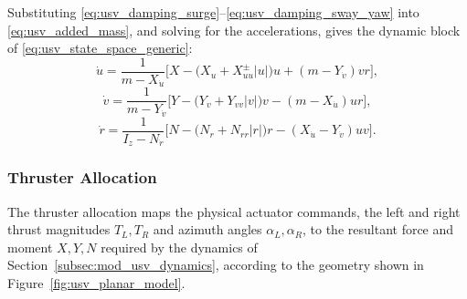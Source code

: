 Substituting \eqref{eq:usv_damping_surge}--\eqref{eq:usv_damping_sway_yaw} into \eqref{eq:usv_added_mass}, and solving for the accelerations, gives the dynamic block of \eqref{eq:usv_state_space_generic}:
\begin{equation}
    \dot{u} = \frac{1}{m - X_{\dot u}}\Big[X - \big(X_u + X_{uu}^{\pm}|u|\big)u + (m - Y_{\dot v})vr\Big],
    \label{eq:usv_udot}
\end{equation}
\begin{equation}
    \dot{v} = \frac{1}{m - Y_{\dot v}}\Big[Y - \big(Y_v + Y_{vv}|v|\big)v - (m - X_{\dot u})ur\Big],
    \label{eq:usv_vdot}
\end{equation}
\begin{equation}
    \dot{r} = \frac{1}{I_z - N_{\dot r}}\Big[N - \big(N_r + N_{rr}|r|\big)r - (X_{\dot u} - Y_{\dot v})uv\Big].
    \label{eq:usv_rdot}
\end{equation}

\subsubsection{Thruster Allocation}
\label{subsec:mod_usv_thruster_allocation}

The thruster allocation maps the physical actuator commands, the left and right thrust magnitudes $T_L, T_R$ and azimuth angles $\alpha_L, \alpha_R$, to the resultant force and moment $X, Y, N$ required by the dynamics of Section~\ref{subsec:mod_usv_dynamics}, according to the geometry shown in Figure~\ref{fig:usv_planar_model}.

